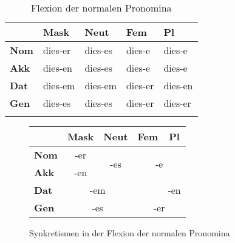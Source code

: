\begin{table}[!h]
  \centering
  \begin{tabular}{lllll}
    \lsptoprule
    \multicolumn{1}{c}{} & \textbf{Mask} & \textbf{Neut} & \textbf{Fem} & \textbf{Pl} \\
    \midrule
    \textbf{Nom} & dies-er & dies-es & dies-e & dies-e \\
    \textbf{Akk} & dies-en & dies-es & dies-e & dies-e \\
    \textbf{Dat} & dies-em & dies-em & dies-er & dies-en \\
    \textbf{Gen} & dies-es & dies-es & dies-er & dies-er \\
    \lspbottomrule
  \end{tabular}
  \caption{Flexion der normalen Pronomina}
  \label{tab:pronflex}
\end{table}

\begin{figure}[!h]
  \centering
  \begin{tabular}{|l|c|c|c|c|}
    \cline{2-5}
    \multicolumn{1}{c|}{} & \textbf{Mask} & \textbf{Neut} & \textbf{Fem} & \textbf{Pl} \\
    \hline
    \textbf{Nom} & -er & \multirow{2}{*}{-es} & \multicolumn{2}{c|}{\multirow{2}{*}{-e}} \\ \cline{2-2}
    \textbf{Akk} & -en && \multicolumn{2}{c|}{} \\ \hline
    \textbf{Dat} & \multicolumn{2}{c|}{-em} && -en \\ \cline{2-3} \cline{5-5}
    \textbf{Gen} & \multicolumn{2}{c|}{-es} & \multicolumn{2}{c|}{-er} \\
    \hline
  \end{tabular}
  \caption{Synkretismen in der Flexion der normalen Pronomina}
  \label{fig:pronflexsynk}
\end{figure}

